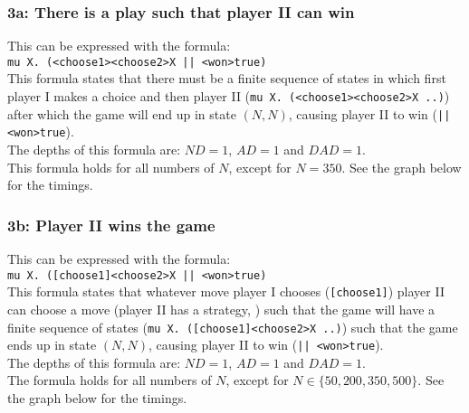 \documentclass[10pt,a4paper]{article}
\begin{document}
\subsubsection{3a: There is a play such that player II can win}
This can be expressed with the formula:\\
{\tt mu X. (<choose1><choose2>X || <won>true)}\\
This formula states that there must be a finite sequence of states in which first player I makes a choice and then player II ({\tt mu X. (<choose1><choose2>X ..)}) after which the game will end up in state $(N, N)$, causing player II to win ({\tt || <won>true}).\\
The depths of this formula are: $ND = 1$, $AD = 1$ and $DAD = 1$.\\
This formula holds for all numbers of $N$, except for $N = 350$. See the graph below for the timings.\\


\subsubsection{3b: Player II wins the game}\label{board2}
This can be expressed with the formula:\\
{\tt mu X. ([choose1]<choose2>X || <won>true)}\\
This formula states that whatever move player I chooses ({\tt [choose1]}) player II can choose a move (player II has a strategy, {\tt <choose2>}) such that the game will have a finite sequence of states ({\tt mu X. ([choose1]<choose2>X ..)}) such that the game ends up in state $(N, N)$, causing player II to win ({\tt || <won>true}).\\
The depths of this formula are: $ND = 1$, $AD = 1$ and $DAD = 1$.\\
The formula holds for all numbers of $N$, except for $N \in \{50, 200, 350, 500\}$. See the graph below for the timings.\\
\end{document}
